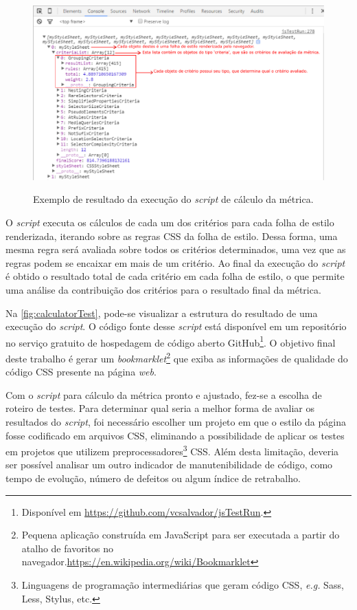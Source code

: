 \begin{figure}[!htb]
	\centering
	\caption{Exemplo de resultado da execução do \textit{script} de cálculo da métrica.}
	\includegraphics[width=1\textwidth]{./04-figuras/calculator}
	\label{fig:calculatorTest}
\end{figure}

O \textit{script} executa os cálculos de cada um dos critérios para cada folha de estilo renderizada, iterando sobre as regras CSS da folha de estilo. Dessa forma, uma mesma regra será avaliada sobre todos os critérios determinados, uma vez que as regras podem se encaixar em mais de um critério. Ao final da execução do \textit{script} é obtido o resultado total de cada critério em cada folha de estilo, o que permite uma análise da contribuição dos critérios para o resultado final da métrica.

Na \autoref{fig:calculatorTest}, pode-se visualizar a estrutura do resultado de uma execução do \textit{script}. O código fonte desse \textit{script} está disponível em um repositório no serviço gratuito de hospedagem de código aberto GitHub\footnote{Disponível em \url{https://github.com/vcsalvador/jsTestRun}.}. O objetivo final deste trabalho é gerar um \textit{bookmarklet}\footnote{Pequena aplicação construída em JavaScript para ser executada a partir do atalho de favoritos no navegador.\url{https://en.wikipedia.org/wiki/Bookmarklet}} que exiba as informações de qualidade do código CSS presente na página \textit{web}.

Com o \textit{script} para cálculo da métrica pronto e ajustado, fez-se a escolha de roteiro de testes. Para determinar qual seria a melhor forma de avaliar os resultados do \textit{script}, foi necessário escolher um projeto em que o estilo da página fosse codificado em arquivos CSS, eliminando a possibilidade de aplicar os testes em projetos que utilizem preprocessadores\footnote{Linguagens de programação intermediárias que geram código CSS, \textit{e.g.} Sass, Less, Stylus, etc.} CSS. Além desta limitação, deveria ser possível analisar um outro indicador de manutenibilidade de código, como tempo de evolução, número de defeitos ou algum índice de retrabalho.

